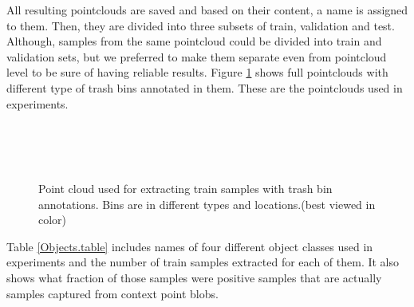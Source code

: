 
All resulting pointclouds are saved and based on their content, a name is assigned to them. 
Then, they are divided into three subsets of train, validation and test. 
Although, samples from the same pointcloud could be divided into train and validation sets, but we preferred to make them 
separate even from pointcloud level to be sure of having reliable results. 
Figure \ref{TrainClouds1.figure:edge} shows full pointclouds with different type of trash bins annotated in them. 
These are the pointclouds used in experiments.


\begin{figure} [htp]
   \begin{center}
     \\
     \\
     \\
  \end{center}
  \caption[Train set pointclouds]
  {Point cloud used for extracting train samples with trash bin annotations. Bins are in different types and locations.(best viewed in color)}
  \label{TrainClouds1.figure:edge}
\end{figure}

Table \ref{Objects.table} includes names of four different object classes used in experiments and the number of train samples extracted for each of them.
It also shows what fraction of those samples were positive samples that are actually samples captured from context point blobs.



